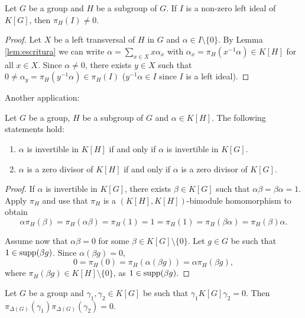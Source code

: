 
\begin{lemma}
	\label{lem:ideal_pi}
	Let $G$ be a group and $H$ be a subgroup of $G$. If $I$ is a non-zero 
	left ideal
	of $K[G]$, then  $\pi_H(I)\ne 0$.
\end{lemma}

\begin{proof}
	Let $X$ be a left transversal of $H$ in $G$ and $\alpha\in I\setminus\{0\}$. By Lemma
	\ref{lem:escritura} we can write $\alpha=\sum_{x\in
	X}x\alpha_x$ with $\alpha_x=\pi_H(x^{-1}\alpha)\in K[H]$ for all $x\in X$.
	Since $\alpha\ne0$, there exists $y\in X$ such that $0\ne
	\alpha_y=\pi_H(y^{-1}\alpha)\in\pi_H(I)$ ($y^{-1}\alpha\in I$ since $I$ is 
    a left ideal).
\end{proof}

Another application:

\begin{proposition}
	Let $G$ be a group, $H$ be a subgroup of $G$ and $\alpha\in K[H]$. The following statements hold:
	\begin{enumerate}
		\item $\alpha$ is invertible in $K[H]$ if and only if $\alpha$ is
			invertible in $K[G]$.
		\item $\alpha$ is a zero divisor of $K[H]$ if and only if $\alpha$ is  
			a zero divisor of $K[G]$.
	\end{enumerate}
\end{proposition}

\begin{proof}
	If $\alpha$ is invertible in $K[G]$, there exists $\beta\in K[G]$ such that 
	$\alpha\beta=\beta\alpha=1$. Apply $\pi_H$ and use that $\pi_H$ 
	is a $(K[H],K[H])$-bimodule homomorphism to obtain  
	\[
		\alpha\pi_H(\beta)=\pi_H(\alpha\beta)=\pi_H(1)=1=\pi_H(1)=\pi_H(\beta\alpha)=\pi_H(\beta)\alpha.
	\]
	
	Assume now that $\alpha\beta=0$ for some $\beta\in K[G]\setminus\{0\}$. Let $g\in G$
	be such that $1\in\operatorname{supp}(\beta g)$. Since $\alpha(\beta g)=0$, 
	\[
		0=\pi_H(0)=\pi_H(\alpha(\beta g))=\alpha\pi_H(\beta g),
	\]
	where $\pi_H(\beta g)\in K[H]\setminus\{0\}$, as $1\in\operatorname{supp}(\beta g)$. 
\end{proof}

\begin{lemma}[Passman]
	\label{lem:Passman}
	Let $G$ be a group and 
	$\gamma_1,\gamma_2\in K[G]$ be such that $\gamma_1K[G]\gamma_2=0$.
	Then $\pi_{\Delta(G)}(\gamma_1)\pi_{\Delta(G)}(\gamma_2)=0$.
\end{lemma}

